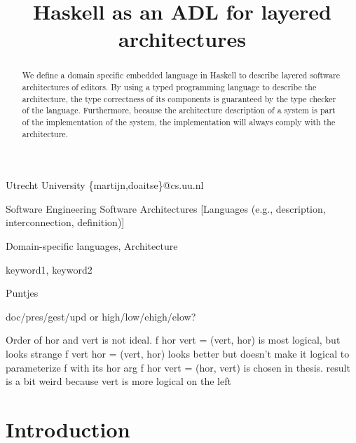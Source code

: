 \documentclass[preprint,natbib]{sigplanconf}
\begin{document}
\copyrightdata{[to be supplied]} 

\preprintfooter{\version}   %

\title{Haskell as an ADL for layered architectures}

           {Utrecht University}
           {\{martijn,doaitse\}@cs.uu.nl}

\maketitle

\begin{abstract}
We define a domain specific embedded language in Haskell to describe
layered software architectures of editors. By using a typed programming
language to describe the architecture, the type correctness of its components
is guaranteed by the type checker of the language. Furthermore, because the
architecture description of a system is part of the implementation of the
system, the implementation will always comply with the architecture.
\end{abstract}

 {Software Engineering}
                  {Software Architectures}
                  [Languages (e.g., description, interconnection, definition)]

\terms
Domain-specific languages, Architecture

\keywords
keyword1, keyword2



\bc
Puntjes

doc/pres/gest/upd or high/low/ehigh/elow?


Order of hor and vert is not ideal.  
f hor vert = (vert, hor) is most logical, but looks strange
f vert hor = (vert, hor) looks better but doesn't make it logical to parameterize f with its hor arg
f hor vert = (hor, vert) is chosen in thesis. result is a bit weird because vert is more logical on the left

\ec

\section{Introduction}\label{sect:introduction}
\end{document}
